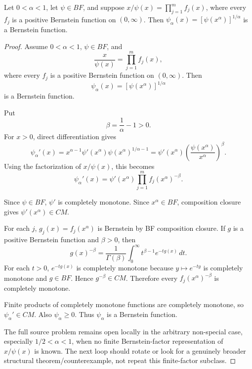\begin{lemma}
\label{res:gt-bf-factorized-denominator-power-closure}
Let \(0<\alpha<1\), let \(\psi\in BF\), and suppose \(x/\psi(x)=\prod_{j=1}^m f_j(x)\), where every \(f_j\) is a positive Bernstein function on \((0,\infty)\). Then \(\psi_\alpha(x)=[\psi(x^\alpha)]^{1/\alpha}\) is a Bernstein function.
\end{lemma}
\begin{proof}
Assume \(0<\alpha<1\), \(\psi\in BF\), and
\[
\frac{x}{\psi(x)}=\prod_{j=1}^m f_j(x),
\]
where every \(f_j\) is a positive Bernstein function on \((0,\infty)\). Then
\[
\psi_\alpha(x)=[\psi(x^\alpha)]^{1/\alpha}
\]
is a Bernstein function.

Put
\[
\beta=\frac1\alpha-1>0.
\]
For \(x>0\), direct differentiation gives
\[
\psi_\alpha'(x)
=x^{\alpha-1}\psi'(x^\alpha)\psi(x^\alpha)^{1/\alpha-1}
=\psi'(x^\alpha)\left(\frac{\psi(x^\alpha)}{x^\alpha}\right)^\beta.
\]
Using the factorization of \(x/\psi(x)\), this becomes
\[
\psi_\alpha'(x)
=\psi'(x^\alpha)\prod_{j=1}^m f_j(x^\alpha)^{-\beta}.
\]

Since \(\psi\in BF\), \(\psi'\) is completely monotone. Since \(x^\alpha\in BF\), composition closure gives \(\psi'(x^\alpha)\in CM\).

For each \(j\), \(g_j(x)=f_j(x^\alpha)\) is Bernstein by BF composition closure. If \(g\) is a positive Bernstein function and \(\beta>0\), then
\[
g(x)^{-\beta}
=\frac1{\Gamma(\beta)}
\int_0^\infty t^{\beta-1}e^{-t g(x)}\,dt.
\]
For each \(t>0\), \(e^{-t g(x)}\) is completely monotone because \(y\mapsto e^{-ty}\) is completely monotone and \(g\in BF\). Hence \(g^{-\beta}\in CM\). Therefore every \(f_j(x^\alpha)^{-\beta}\) is completely monotone.

Finite products of completely monotone functions are completely monotone, so \(\psi_\alpha'\in CM\). Also \(\psi_\alpha\ge0\). Thus \(\psi_\alpha\) is a Bernstein function.

The full source problem remains open locally in the arbitrary non-special case, especially \(1/2<\alpha<1\), when no finite Bernstein-factor representation of \(x/\psi(x)\) is known. The next loop should rotate or look for a genuinely broader structural theorem/counterexample, not repeat this finite-factor subclass.
\end{proof}

